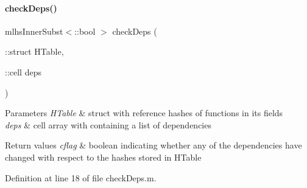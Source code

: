 \paragraph{\texorpdfstring{check\+Deps()}{checkDeps()}}
{\footnotesize\ttfamily mlhs\+Inner\+Subst$<$\+::bool $>$ check\+Deps (\begin{DoxyParamCaption}\item[{\+::struct}]{H\+Table,  }\item[{\+::cell}]{deps }\end{DoxyParamCaption})}


\begin{DoxyParams}{Parameters}
{\em H\+Table} & struct with reference hashes of functions in its fields\\
\hline
{\em deps} & cell array with containing a list of dependencies\\
\hline
\end{DoxyParams}

\begin{DoxyRetVals}{Return values}
{\em cflag} & boolean indicating whether any of the dependencies have changed with respect to the hashes stored in H\+Table \\
\hline
\end{DoxyRetVals}


Definition at line 18 of file check\+Deps.\+m.

